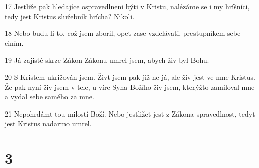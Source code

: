 \par 17 Jestliže pak hledajíce ospravedlneni býti v Kristu, nalézáme se i my hríšníci, tedy jest Kristus služebník hrícha? Nikoli.
\par 18 Nebo budu-li to, což jsem zboril, opet zase vzdelávati, prestupníkem sebe ciním.
\par 19 Já zajisté skrze Zákon Zákonu umrel jsem, abych živ byl Bohu.
\par 20 S Kristem ukrižován jsem. Živt jsem pak již ne já, ale živ jest ve mne Kristus. Že pak nyní živ jsem v tele, u víre Syna Božího živ jsem, kterýžto zamiloval mne a vydal sebe samého za mne.
\par 21 Nepohrdámt tou milostí Boží. Nebo jestližet jest z Zákona spravedlnost, tedyt jest Kristus nadarmo umrel.

\chapter{3}

